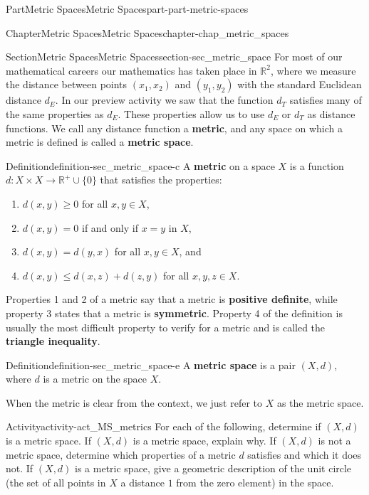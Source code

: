 \documentclass[oneside,10pt,]{book}
\newcommand{\terminology}[1]{\textbf{#1}}
\numberwithin{equation}{chapter}
\newcommand{\R}{\mathbb{R}}
\begin{document}
\begin{partptx}{Part}{Metric Spaces}{}{Metric Spaces}{}{}{part-part-metric-spaces}
\begin{chapterptx}{Chapter}{Metric Spaces}{}{Metric Spaces}{}{}{chapter-chap_metric_spaces}
\begin{sectionptx}{Section}{Metric Spaces}{}{Metric Spaces}{}{}{section-sec_metric_space}
For most of our mathematical careers our mathematics has taken place in \(\R^2\), where we measure the distance between points \((x_1,x_2)\) and \((y_1,y_2)\) with the standard Euclidean distance \(d_E\). In our preview activity we saw that the function \(d_T\) satisfies many of the same properties as \(d_E\). These properties allow us to use \(d_E\) or \(d_T\) as distance functions. We call any distance function a \terminology{metric}, and any space on which a metric is defined is called a \terminology{metric space}.%
\begin{definition}{Definition}{}{definition-sec_metric_space-c}%
%
A \terminology{metric} on a space \(X\) is a function \(d : X \times X \to \R^+ \cup \{0\}\) that satisfies the properties:%
\begin{enumerate}
\item{}\(d(x,y) \geq 0\) for all \(x,y \in X\),%
\item{}\(d(x,y) = 0\) if and only if \(x = y\) in \(X\),%
\item{}\(d(x,y) = d(y,x)\) for all \(x, y \in X\), and%
\item{}\(d(x,y) \leq d(x,z) + d(z,y)\) for all \(x,y,z \in X\).%
\end{enumerate}
%
\end{definition}
Properties 1 and 2 of a metric say that a metric is \terminology{positive definite}, while property 3 states that a metric is \terminology{symmetric}. Property 4 of the definition is usually the most difficult property to verify for a metric and is called the \terminology{triangle inequality}. %
\begin{definition}{Definition}{}{definition-sec_metric_space-e}%
%
A \terminology{metric space} is a pair \((X,d)\), where \(d\) is a metric on the space \(X\).%
\end{definition}
When the metric is clear from the context, we just refer to \(X\) as the metric space.%
\begin{activity}{Activity}{}{activity-act_MS_metrics}%
For each of the following, determine if \((X,d)\) is a metric space. If \((X,d)\) is a metric space, explain why. If \((X,d)\) is not a metric space, determine which properties of a metric \(d\) satisfies and which it does not. If \((X,d)\) is a metric space, give a geometric description of the unit circle (the set of all points in \(X\) a distance \(1\) from the zero element) in the space.%
\begin{enumerate}[font=\bfseries,label=(\alph*),ref=\alph*]%

\end{enumerate}
\end{activity}
\end{sectionptx}
\end{chapterptx}
\end{partptx}
\end{document}
